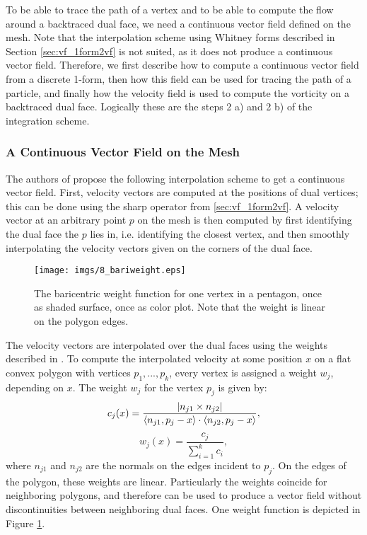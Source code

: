 To be able to trace the path of a vertex and to be able to compute the flow around a backtraced dual face, we need a continuous vector field defined on the mesh. Note that the interpolation scheme using Whitney forms described in Section \ref{sec:vf_1form2vf} is not suited, as it does not produce a continuous vector field. Therefore, we first describe how to compute a continuous vector field from a discrete 1-form, then how this field can be used for tracing the path of a particle, and finally how the velocity field is used to compute the vorticity on a backtraced dual face. Logically these are the steps 2 a) and 2 b) of the integration scheme.

\subsubsection{A Continuous Vector Field on the Mesh}

The authors of \cite{simplicialFluids} propose the following interpolation scheme to get a  continuous vector field. First, velocity vectors are computed at the positions of dual vertices; this can be done using the sharp operator from \ref{sec:vf_1form2vf}. A velocity vector at an arbitrary point $p$ on the mesh is then computed by first identifying the dual face the $p$ lies in, i.e. identifying the closest vertex,  and then smoothly interpolating the velocity vectors given on the corners of the dual face.

\begin{figure}%
\begin{center}
\texttt{[image: imgs/8\_bariweight.eps]}%
\end{center}
\caption{The baricentric weight function for one vertex in a pentagon, once as shaded surface, once as color plot. Note that the weight is linear on the polygon edges.}%
\label{fig:fd_bariweight}%
\end{figure}

The velocity vectors are interpolated over the dual faces using the weights described in \cite{citeulike:2398873}. To compute the interpolated velocity at some position $x$ on a flat convex polygon with vertices $p_1,...,p_k$, every vertex is assigned a weight $w_j$, depending on $x$. The weight $w_j$ for the vertex $p_j$ is given by: 
\[c_j(x) = \frac{\left| n_{j1} \times n_{j2} \right|}{\langle n_{j1}, p_j -x\rangle\cdot\langle n_{j2}, p_j -x\rangle},\]
\[w_j(x) = \frac{c_j}{\sum_{i=1}^k c_i},\]
where $n_{j1}$ and $n_{j2}$ are the normals on the edges incident to $p_j$.
On the edges of the polygon, these weights are linear. Particularly the weights coincide for neighboring polygons, and therefore can be used to produce a vector field without discontinuities between neighboring dual faces. One weight function is depicted in Figure \ref{fig:fd_bariweight}.

